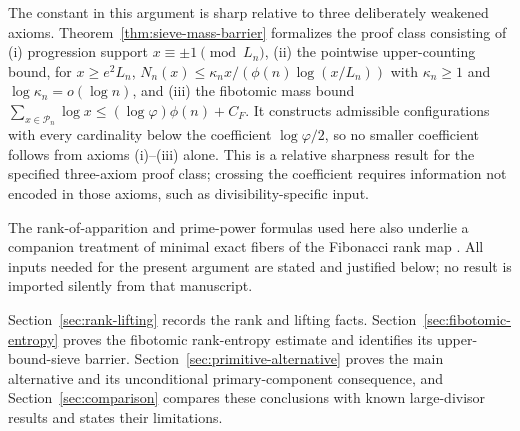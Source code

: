 The constant in this argument is sharp relative to three deliberately
weakened axioms.  Theorem~\ref{thm:sieve-mass-barrier} formalizes the proof
class consisting of (i) progression support $x\equiv\pm1\pmod{L_n}$, (ii) the
pointwise upper-counting bound, for $x\geq e^2L_n$,
$N_n(x)\leq\kappa_n x/(\phi(n)\log(x/L_n))$ with $\kappa_n\geq1$ and
$\log\kappa_n=o(\log n)$, and (iii) the fibotomic mass bound
$\sum_{x\in\mathcal P_n}\log x\leq(\log\varphi)\phi(n)+C_F$.  It constructs
admissible configurations with every cardinality below the coefficient
$\log\varphi/2$, so no smaller coefficient follows from axioms (i)--(iii)
alone.  This is a relative sharpness result for the specified three-axiom
proof class; crossing the coefficient requires information not encoded in
those axioms, such as divisibility-specific input.

The rank-of-apparition and prime-power formulas used here also underlie a
companion treatment of minimal exact fibers of the Fibonacci rank map
\cite{MaZhang2026MinimalPreimages}.  All inputs needed for the present
argument are stated and justified below; no result is imported silently
from that manuscript.

Section~\ref{sec:rank-lifting} records the rank and lifting facts.
Section~\ref{sec:fibotomic-entropy} proves the fibotomic rank-entropy
estimate and identifies its upper-bound-sieve barrier.
Section~\ref{sec:primitive-alternative} proves the main
alternative and its unconditional primary-component consequence, and
Section~\ref{sec:comparison} compares these conclusions with known
large-divisor results and states their limitations.
